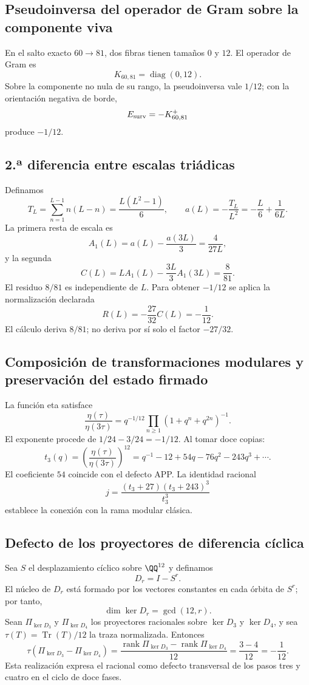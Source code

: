 \subsection{Pseudoinversa del operador de Gram sobre la componente viva}

En el salto exacto \(60\to81\), dos fibras tienen tamaños \(0\) y
\(12\). El operador de Gram es
\[
K_{60,81}=\operatorname{diag}(0,12).
\]
Sobre la componente no nula de su rango, la pseudoinversa vale \(1/12\); con la orientación
negativa de borde,
\[
E_{\rm surv}=-K_{60,81}^{+}
\]
produce \(-1/12\).

\subsection{2.ª diferencia entre escalas triádicas}

Definamos
\[
T_L=\sum_{n=1}^{L-1}n(L-n)=\frac{L(L^2-1)}6,
\qquad
a(L)=-\frac{T_L}{L^2}=-\frac L6+\frac1{6L}.
\]
La primera resta de escala es
\[
A_1(L)=a(L)-\frac{a(3L)}3=\frac4{27L},
\]
y la segunda
\[
C(L)=LA_1(L)-\frac{3L}{3}A_1(3L)=\frac8{81}.
\]
El residuo \(8/81\) es independiente de \(L\). Para obtener
\(-1/12\) se aplica la normalización declarada
\[
R(L)=-\frac{27}{32}C(L)=-\frac1{12}.
\]
El cálculo deriva \(8/81\); no deriva por sí solo el factor \(-27/32\).

\subsection{Composición de transformaciones modulares y preservación del estado firmado}

La función eta satisface
\[
\frac{\eta(\tau)}{\eta(3\tau)}
=q^{-1/12}\prod_{n\ge1}(1+q^n+q^{2n})^{-1}.
\]
El exponente procede de \(1/24-3/24=-1/12\). Al tomar doce copias:
\[
t_3(q)=\left(\frac{\eta(\tau)}{\eta(3\tau)}\right)^{12}
=q^{-1}-12+54q-76q^2-243q^3+\cdots.
\]
El coeficiente \(54\) coincide con el defecto APP\@. La identidad racional
\[
j=\frac{(t_3+27)(t_3+243)^3}{t_3^3}
\]
establece la conexión con la rama modular clásica.

\subsection{Defecto de los proyectores de diferencia cíclica}

Sea \(S\) el desplazamiento cíclico sobre \(\QQ^{12}\) y definamos
\[
 D_r=I-S^r.
\]
El núcleo de \(D_r\) está formado por los vectores constantes en cada órbita
de \(S^r\); por tanto,
\[
 \dim\ker D_r=\gcd(12,r).
\]
Sean \(\Pi_{\ker D_3}\) y \(\Pi_{\ker D_4}\) los proyectores racionales sobre
\(\ker D_3\) y \(\ker D_4\), y sea
\(\tau(T)=\operatorname{Tr}(T)/12\) la traza normalizada. Entonces
\[
 \boxed{
 \tau(\Pi_{\ker D_3}-\Pi_{\ker D_4})
 =\frac{\operatorname{rank}\Pi_{\ker D_3}
       -\operatorname{rank}\Pi_{\ker D_4}}{12}
 =\frac{3-4}{12}
 =-\frac1{12}.}
\]
Esta realización expresa el racional como defecto transversal de los pasos
tres y cuatro en el ciclo de doce fases.

